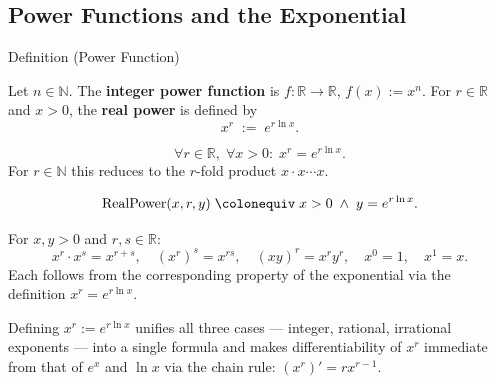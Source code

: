 
\subsection*{Power Functions and the Exponential}
\label{sec:power-exponential}


\begin{definitionbox}{Definition (Power Function)}
\begin{definition}
\label{def:power-function}
Let $n \in \mathbb{N}$. The \textbf{integer power function} is
$f : \mathbb{R} \to \mathbb{R}$, $f(x) := x^n$. For $r \in \mathbb{R}$
and $x > 0$, the \textbf{real power} is defined by
\[
  x^r \;:=\; e^{r \ln x}.
\]
\end{definition}
\end{definitionbox}

\begin{remark*}
\[
  \forall r \in \mathbb{R},\; \forall x > 0 :\; x^r = e^{r\ln x}.
\]
For $r \in \mathbb{N}$ this reduces to the $r$-fold product
$x \cdot x \cdots x$.
\end{remark*}

\begin{remark*}
\[
  \operatorname{RealPower}(x, r, y)
  \;\colonequiv\;
  x > 0 \;\wedge\; y = e^{r \ln x}.
\]
\end{remark*}

\begin{remark*}
For $x, y > 0$ and $r, s \in \mathbb{R}$:
\[
  x^r \cdot x^s = x^{r+s}, \quad
  (x^r)^s = x^{rs}, \quad
  (xy)^r = x^r y^r, \quad
  x^0 = 1, \quad
  x^1 = x.
\]
Each follows from the corresponding property of the exponential via
the definition $x^r = e^{r\ln x}$.
\end{remark*}

\begin{remark*}[Interpretation]
Defining $x^r := e^{r\ln x}$ unifies all three cases --- integer,
rational, irrational exponents --- into a single formula and makes
differentiability of $x^r$ immediate from that of $e^x$ and $\ln x$
via the chain rule: $(x^r)' = rx^{r-1}$.
\end{remark*}

